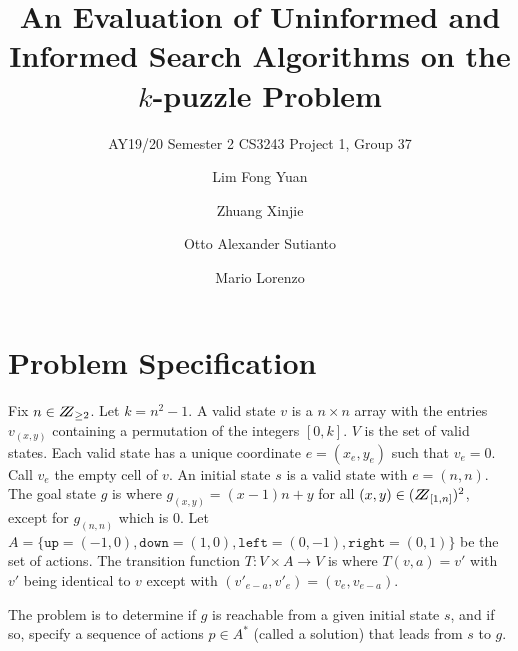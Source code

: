 \documentclass[runningheads]{llncs}
\begin{document}
%
\title{An Evaluation of Uninformed and Informed Search Algorithms on the $k$-puzzle Problem}
\subtitle{AY19/20 Semester 2 CS3243 Project 1, Group 37}
%
%
\author{Lim Fong Yuan \and
Zhuang Xinjie \and
Otto Alexander Sutianto \and
Mario Lorenzo}
%
%
%
\maketitle              %
%

%
%
%
\section{Problem Specification}
Fix $n \in \bbbz_{\geq 2}$. Let $k = n^2 -1$.
A valid state $v$ is a $n \times n$ array with the entries $v_{(x,y)}$ containing a permutation of the integers $[0,k]$. $V$ is the set of valid states.
Each valid state has a unique coordinate $e = (x_e,y_e)$ such that $v_e = 0$. Call $v_e$ the empty cell of $v$.
An initial state $s$ is a valid state with $e = (n,n)$.
The goal state $g$ is where $g_{(x,y)} = (x-1)n+y$ for all $(x,y) \in (\bbbz_{[1,n]})^2$, except for $g_{(n,n)}$ which is $0$.
Let $A = \{\texttt{up}=(-1,0),\texttt{down}=(1,0),\texttt{left}=(0,-1),\texttt{right}=(0,1)\}$ be the set of actions.
The transition function $T: V \times A \to V$ is where $T(v,a) = v'$ with $v'$ being identical to $v$ except with $(v'_{e-a},v'_e) = (v_e,v_{e-a})$.%

The problem is to determine if $g$ is reachable from a given initial state $s$, and if so, specify a sequence of actions $p \in A^\ast$ (called a solution) that leads from $s$ to $g$.
\end{document}
